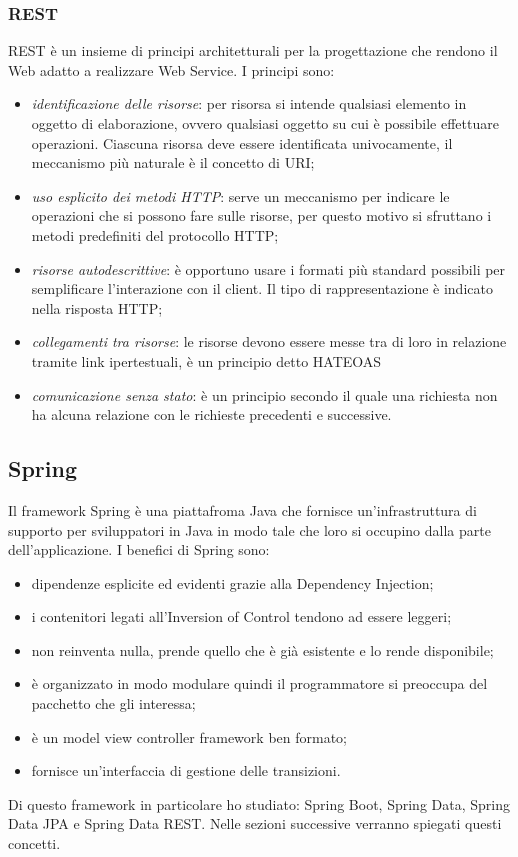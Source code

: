 \subsubsection{REST}

REST è un insieme di principi architetturali per la progettazione che rendono il Web adatto a realizzare Web Service. I principi sono:
\begin{itemize}
	\item \textit{identificazione delle risorse}: per risorsa si intende qualsiasi elemento in oggetto di elaborazione, ovvero qualsiasi oggetto su cui è possibile effettuare operazioni. Ciascuna risorsa deve essere identificata univocamente, il meccanismo più naturale è il concetto di URI;
	\item \textit{uso esplicito dei metodi HTTP}: serve un meccanismo per indicare le operazioni che si possono fare sulle risorse, per questo motivo si sfruttano i metodi predefiniti del protocollo HTTP;
	\item \textit{risorse autodescrittive}: è opportuno usare i formati più standard possibili per semplificare l'interazione con il client. Il tipo di rappresentazione è indicato nella risposta HTTP;
	\item \textit{collegamenti tra risorse}: le risorse devono essere messe tra di loro in relazione tramite link ipertestuali, è un principio detto HATEOAS
	\item \textit{comunicazione senza stato}: è un principio secondo il quale una richiesta non ha alcuna relazione con le richieste precedenti e successive.
\end{itemize}

\subsection{Spring}

Il framework Spring è una piattafroma Java che fornisce un'infrastruttura di supporto per sviluppatori in Java in modo tale che loro si occupino dalla parte dell'applicazione. I benefici di Spring sono:
\begin{itemize}
	\item dipendenze esplicite ed evidenti grazie alla Dependency Injection;
	\item i contenitori legati all'Inversion of Control tendono ad essere leggeri;
	\item non reinventa nulla, prende quello che è già esistente e lo rende disponibile;
	\item è organizzato in modo modulare quindi il programmatore si preoccupa del pacchetto che gli interessa;
	\item è un model view controller framework ben formato;
	\item fornisce un'interfaccia di gestione delle transizioni.
\end{itemize}
Di questo framework in particolare ho studiato: Spring Boot, Spring Data, Spring Data JPA e Spring Data REST. Nelle sezioni successive verranno spiegati questi concetti.

